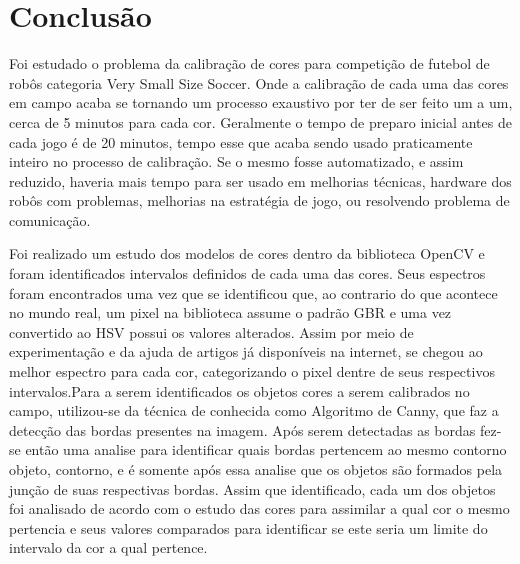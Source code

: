
\chapter{Conclusão} \label{Cap:Conclusao}


Foi estudado o problema da calibração de cores para competição de futebol de robôs categoria Very Small Size Soccer. Onde a calibração de cada uma das cores em campo acaba se tornando um processo exaustivo por ter de ser feito um a um, cerca de 5 minutos para cada cor. Geralmente o tempo de preparo inicial antes de cada jogo é de 20 minutos, tempo esse que acaba sendo usado praticamente inteiro no processo de calibração. Se o mesmo fosse automatizado, e assim reduzido, haveria mais tempo para ser usado em melhorias técnicas, hardware dos robôs com problemas, melhorias na estratégia de jogo, ou resolvendo problema de comunicação.

	Foi realizado um estudo dos modelos de cores dentro da biblioteca OpenCV e foram identificados intervalos definidos de cada uma das cores. Seus espectros foram encontrados uma vez que se identificou que, ao contrario do que acontece no mundo real, um pixel na biblioteca assume o  padrão GBR e uma vez convertido ao HSV possui os valores alterados. Assim por meio de experimentação e da ajuda de artigos já disponíveis na internet, se chegou ao melhor espectro para cada cor, categorizando o pixel dentre de seus respectivos intervalos.Para a serem identificados os objetos cores a serem calibrados no campo, utilizou-se da técnica de conhecida como Algoritmo de Canny, que faz a detecção das bordas presentes na imagem. Após serem detectadas as bordas fez-se então uma analise para identificar quais bordas pertencem ao mesmo contorno objeto, contorno, e é somente após essa analise que os objetos são formados pela junção de suas respectivas bordas. Assim que identificado, cada um dos objetos foi analisado de acordo com o estudo das cores para assimilar a qual cor o mesmo pertencia e seus valores comparados para identificar se este seria um limite do intervalo da cor a qual pertence.

